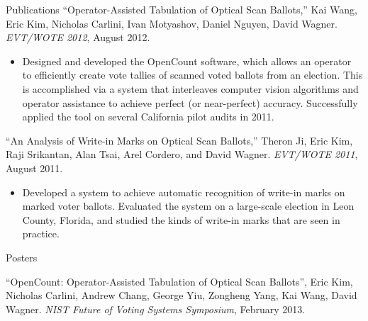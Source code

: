 \documentclass{resume}
\begin{document}
\begin{component}{Publications}
``Operator-Assisted Tabulation of Optical Scan Ballots,'' Kai Wang, Eric Kim, Nicholas Carlini, Ivan Motyashov, Daniel Nguyen, David Wagner. \emph{EVT/WOTE 2012}, August 2012.
        \begin{itemize}
        \vspace{-0.5em}\item[] Designed and developed the OpenCount software, which allows an operator
to efficiently create vote tallies of scanned voted ballots from an election. This is accomplished via a system 
that interleaves computer vision algorithms and operator assistance to achieve perfect (or near-perfect) accuracy.
Successfully applied the tool on several California pilot audits in 2011. 
        \end{itemize}

``An Analysis of Write-in Marks on Optical Scan Ballots,'' Theron Ji, Eric Kim, Raji Srikantan, Alan Tsai, Arel Cordero, and David Wagner. \emph{EVT/WOTE 2011}, August 2011.
	\begin{itemize}
	\vspace{-0.5em}\item[] Developed a system to achieve automatic recognition of write-in marks on marked voter ballots. Evaluated the system on
				       a large-scale election in Leon County, Florida, and studied the kinds of write-in marks that are seen in practice.
	\end{itemize}
\end{component}

\vspace{-0.5em}

\begin{component}{Posters}

``OpenCount: Operator-Assisted Tabulation of Optical Scan Ballots'', Eric Kim, Nicholas Carlini, Andrew Chang, George Yiu, Zongheng Yang, Kai Wang, David Wagner. \emph{NIST Future of Voting Systems Symposium}, February 2013. 
\end{component}

\vspace{0.5em}
\end{document}
